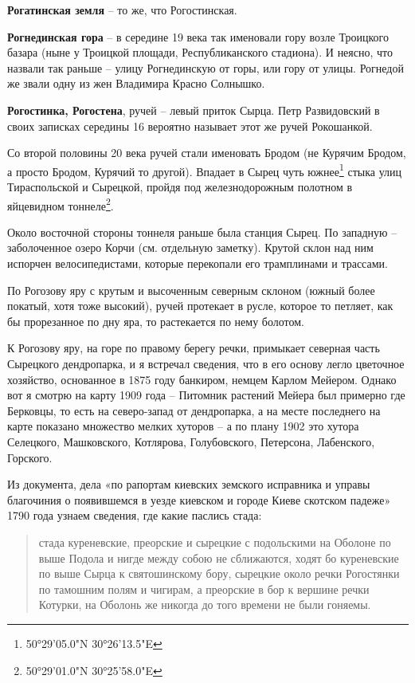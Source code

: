 \medskip

\textbf{Рогатинская земля} – то же, что Рогостинская.\\

\medskip

\textbf{Рогнединская гора} – в середине 19 века так именовали гору возле Троицкого базара (ны\-не у Троицкой площади, Республиканского стадиона). И неясно, что назвали так раньше – улицу Рогнединскую от горы, или гору от улицы. Рогнедой же звали одну из жен Владимира Красно Солнышко.\\

\medskip

\textbf{Рогостинка, Рогостена}, ручей – левый приток Сырца. Петр Развидовский в своих записках середины 16 вероятно называет этот же ручей Рокошанкой.

Со второй половины 20 века ручей стали именовать Бродом (не Курячим Бродом, а просто Бродом, Курячий то другой). Впадает в Сырец чуть южнее\footnote{50°29'05.0"N 30°26'13.5"E} стыка улиц Тираспольской и Сырецкой, пройдя под железнодорожным полотном в яйцевидном тоннеле\footnote{50°29'01.0"N 30°25'58.0"E}.

Около восточной стороны тоннеля раньше была станция Сырец. По западную – заболоченное озеро Корчи (см. отдельную заметку). Крутой склон над ним испорчен велосипедистами, которые перекопали его трамплинами и трассами.

По Рогозову яру с крутым и высоченным северным склоном (южный более покатый, хотя тоже высокий), ручей протекает в русле, которое то петляет, как бы прорезанное по дну яра, то растекается по нему болотом.

К Рогозову яру, на горе по правому берегу речки, примыкает северная часть Сырецкого дендропарка, и я встречал сведения, что в его основу легло цветочное хозяйство, основанное в 1875 году банкиром, немцем Карлом Мейером. Однако вот я смотрю на карту 1909 года – Питомник растений Мейера был примерно где Берковцы, то есть на северо-запад от дендропарка, а на месте последнего на карте показано множество мелких хуторов – а по плану 1902 это хутора Селецкого, Машковского, Котлярова, Голубовского, Петерсона, Лабенского, Горского.

Из документа, дела «по рапортам киевских земского исправника и управы благочиния о появившемся в уезде киевском и городе Киеве скотском падеже» 1790 года узнаем сведения, где какие паслись стада:

\begin{quotation}
стада куреневские, преорские и сырецкие с подольскими на Оболоне по выше Подола и нигде между собою не сближаются, ходят бо куреневские по выше Сырца к святошинскому бору, сырецкие около речки Рогостянки по тамошним полям и чигирам, а преорские в бор к вершине речки Котурки, на Оболонь же никогда до того времени не были гоняемы.
\end{quotation}

